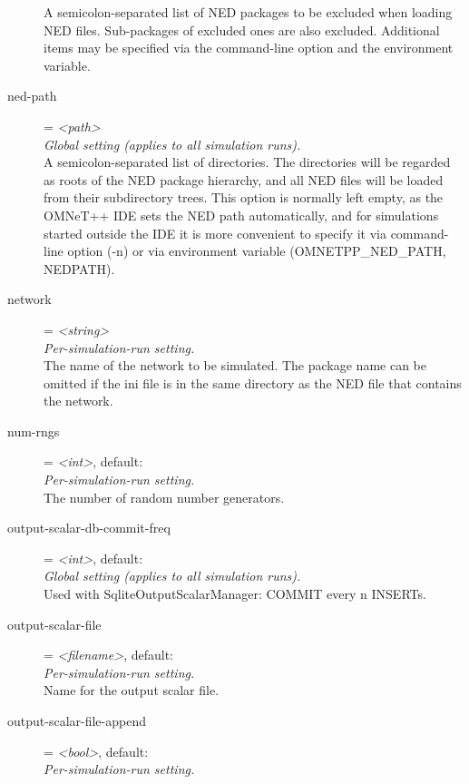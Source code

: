 \begin{description}
    A semicolon-separated list of NED packages to be excluded when loading NED
    files. Sub-packages of excluded ones are also excluded. Additional items
    may be specified via the  command-line option and the
     environment variable.
\item[ned-path] = \textit{<path>}\\
    \textit{Global setting (applies to all simulation runs).}\\
    A semicolon-separated list of directories. The directories will be regarded
    as roots of the NED package hierarchy, and all NED files will be loaded
    from their subdirectory trees. This option is normally left empty, as the
    OMNeT++ IDE sets the NED path automatically, and for simulations started
    outside the IDE it is more convenient to specify it via command-line option
    (-n) or via environment variable (OMNETPP\_NED\_PATH, NEDPATH).
\item[network] = \textit{<string>}\\
    \textit{Per-simulation-run setting.}\\
    The name of the network to be simulated.  The package name can be omitted
    if the ini file is in the same directory as the NED file that contains the
    network.
\item[num-rngs] = \textit{<int>}, default: \\
    \textit{Per-simulation-run setting.}\\
    The number of random number generators.
\item[output-scalar-db-commit-freq] = \textit{<int>}, default: \\
    \textit{Global setting (applies to all simulation runs).}\\
    Used with SqliteOutputScalarManager: COMMIT every n INSERTs.
\item[output-scalar-file] = \textit{<filename>}, default: \\
    \textit{Per-simulation-run setting.}\\
    Name for the output scalar file.
\item[output-scalar-file-append] = \textit{<bool>}, default: \\
    \textit{Per-simulation-run setting.}\\

\end{description}
